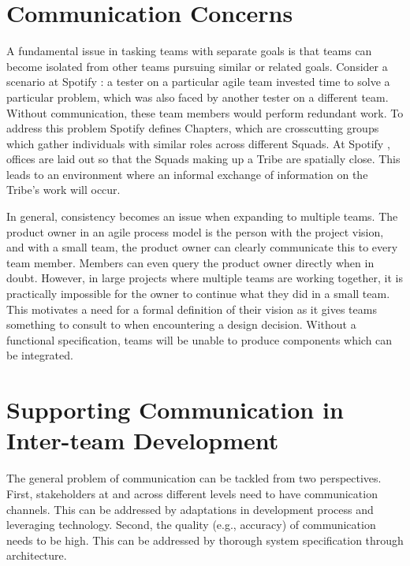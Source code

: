 ﻿\section{Communication Concerns}\label{sec:spt_ex} 
A fundamental issue in tasking teams with separate goals is that teams can become isolated from other teams pursuing similar or related goals.
Consider a scenario at Spotify \cite{kniberg12}: a tester on a particular agile team invested time to solve a particular problem, which was also faced by another tester on a different team. Without communication, these team members would perform redundant work.
To address this problem Spotify defines Chapters, which are crosscutting groups which gather individuals with similar roles across different Squads. 
At Spotify \cite{kniberg12}, offices are laid out so that the Squads making up a Tribe are spatially close.
This leads to an environment where an informal exchange of information on the Tribe's work will occur.

In general, consistency becomes an issue when expanding to multiple teams.
The product owner in an agile process model is the person with the project vision, and with a small team, the product owner can clearly communicate this to every team member.
Members can even query the product owner directly when in doubt.
However, in large projects where multiple teams are working together, it is practically impossible for the owner to continue what they did in a small team.
This motivates a need for a formal definition of their vision as it gives teams something to consult to when encountering a design decision.
Without a functional specification, teams will be unable to produce components which can be integrated.

\section{Supporting Communication in Inter-team Development}
\label{sec:prop_appro} 
The general problem of communication can be tackled from two perspectives.
First, stakeholders at and across different levels need to have communication channels.
This can be addressed by adaptations in development process and leveraging technology.
Second, the quality (e.g., accuracy) of communication needs to be high.
This can be addressed by thorough system specification through architecture.

